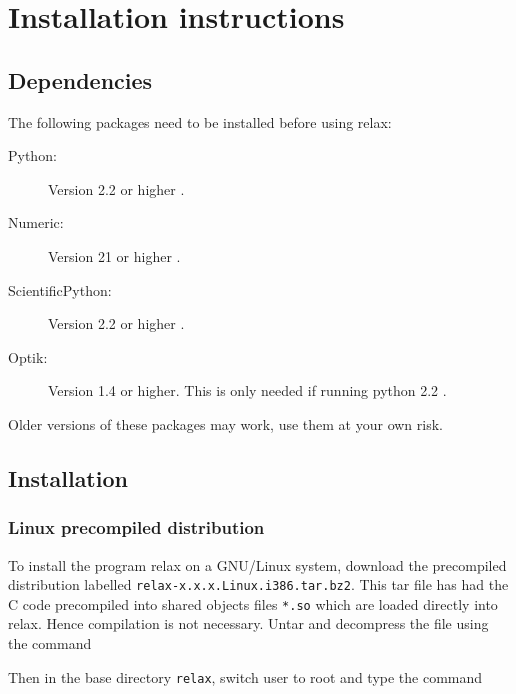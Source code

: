 
\chapter{Installation instructions}



\section{Dependencies}

The following packages need to be installed before using relax:

\begin{description}
\item[Python:]  Version 2.2 or higher .
\item[Numeric:]  Version 21 or higher .
\item[ScientificPython:]  Version 2.2 or higher .
\item[Optik:]  Version 1.4 or higher.  This is only needed if running python 2.2 .
\end{description}

Older versions of these packages may work, use them at your own risk.




\section{Installation}

\subsection{Linux precompiled distribution}

To install the program relax on a GNU/Linux system, download the precompiled distribution labelled \texttt{relax-x.x.x.Linux.i386.tar.bz2}.  This tar file has had the C code precompiled into shared objects files \texttt{*.so} which are loaded directly into relax.  Hence compilation is not necessary.  Untar and decompress the file using the command


Then in the base directory \texttt{relax}, switch user to root and type the command

